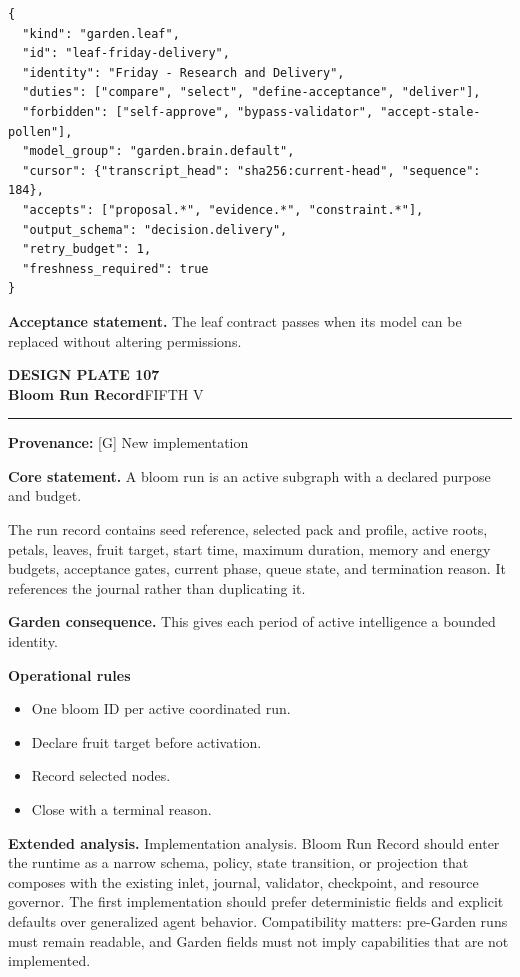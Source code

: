 \documentclass[10pt,letterpaper,oneside]{article}
\newcommand{\prov}[1]{\textcolor{gardenBlue}{\sffamily\footnotesize\textbf{Provenance:} #1}}
\newcommand{\platetitle}[3]{%
  \begin{minipage}[t][0.54in][t]{\textwidth}
  {\sffamily\bfseries\color{gardenDeep}\fontsize{9}{10}\selectfont DESIGN PLATE #1}\\[-1pt]
  {\sffamily\bfseries\color{gardenInk}\fontsize{16.5}{18}\selectfont #2}\hfill{\sffamily\color{gardenGreen}\large #3}
  \end{minipage}\vspace{-2pt}\hrule\vspace{5pt}}
\begin{document}
\begin{lstlisting}
{
  "kind": "garden.leaf",
  "id": "leaf-friday-delivery",
  "identity": "Friday - Research and Delivery",
  "duties": ["compare", "select", "define-acceptance", "deliver"],
  "forbidden": ["self-approve", "bypass-validator", "accept-stale-pollen"],
  "model_group": "garden.brain.default",
  "cursor": {"transcript_head": "sha256:current-head", "sequence": 184},
  "accepts": ["proposal.*", "evidence.*", "constraint.*"],
  "output_schema": "decision.delivery",
  "retry_budget": 1,
  "freshness_required": true
}
\end{lstlisting}
\begin{acceptbox}
\textbf{Acceptance statement.} The leaf contract passes when its model can be replaced without altering permissions.
\end{acceptbox}
\newpage
\platetitle{107}{Bloom Run Record}{FIFTH V}
\prov{[G] New implementation}
\fontsize{8.85}{10.45}\selectfont
\begin{corebox}
\textbf{Core statement.} A bloom run is an active subgraph with a declared purpose and budget.
\end{corebox}
The run record contains seed reference, selected pack and profile, active roots, petals, leaves, fruit target, start time, maximum duration, memory and energy budgets, acceptance gates, current phase, queue state, and termination reason. It references the journal rather than duplicating it.

\textbf{Garden consequence.} This gives each period of active intelligence a bounded identity.

\textbf{Operational rules}
\begin{itemize}
\item One bloom ID per active coordinated run.
\item Declare fruit target before activation.
\item Record selected nodes.
\item Close with a terminal reason.
\end{itemize}
\textbf{Extended analysis.} Implementation analysis. Bloom Run Record should enter the runtime as a narrow schema, policy, state transition, or projection that composes with the existing inlet, journal, validator, checkpoint, and resource governor. The first implementation should prefer deterministic fields and explicit defaults over generalized agent behavior. Compatibility matters: pre-Garden runs must remain readable, and Garden fields must not imply capabilities that are not implemented.
\end{document}
